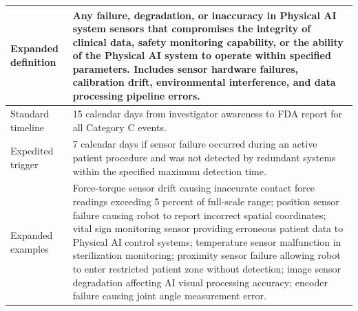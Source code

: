 \begin{table}[H]
\begin{tabularx}{\textwidth}{l X}
\midrule
Expanded definition & Any failure, degradation, or inaccuracy in Physical AI system sensors that compromises the integrity of clinical data, safety monitoring capability, or the ability of the Physical AI system to operate within specified parameters. Includes sensor hardware failures, calibration drift, environmental interference, and data processing pipeline errors. \\
\midrule
Standard timeline & 15 calendar days from investigator awareness to FDA report for all Category C events. \\
\midrule
Expedited trigger & 7 calendar days if sensor failure occurred during an active patient procedure and was not detected by redundant systems within the specified maximum detection time. \\
\midrule
Expanded examples & Force-torque sensor drift causing inaccurate contact force readings exceeding 5 percent of full-scale range; position sensor failure causing robot to report incorrect spatial coordinates; vital sign monitoring sensor providing erroneous patient data to Physical AI control systems; temperature sensor malfunction in sterilization monitoring; proximity sensor failure allowing robot to enter restricted patient zone without detection; image sensor degradation affecting AI visual processing accuracy; encoder failure causing joint angle measurement error. \\

\end{tabularx}
\end{table}
